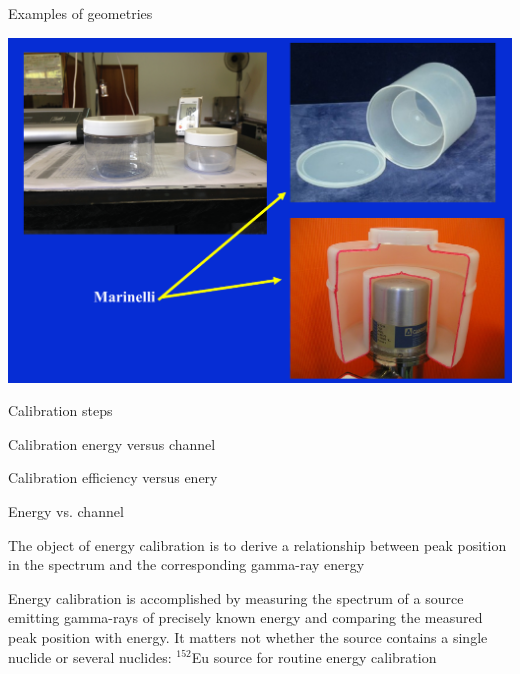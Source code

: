 \begin{frame}{Examples of geometries}

\centering
\includegraphics[scale=0.27]{figures/geometries.png}

\end{frame}

\begin{frame}{Calibration steps}

\begin{block}{}
Calibration energy versus channel 
\end{block}


\begin{block}{}
Calibration efficiency versus enery 
\end{block}

\end{frame}

\begin{frame}{Energy vs. channel}

\alert{The object of energy calibration is to derive a relationship between peak position in the spectrum and the corresponding gamma-ray energy}

\begin{block}{}
Energy calibration is accomplished by measuring the spectrum of a source emitting gamma-rays of precisely known energy and comparing the measured peak position with energy. It matters not whether the source contains a single nuclide or several nuclides: $^{152}$Eu source for routine energy calibration
\end{block}

\end{frame}


